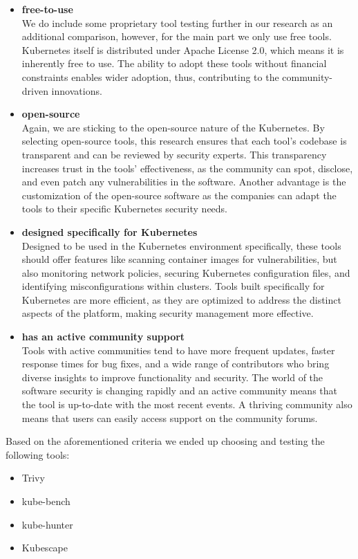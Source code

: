 \begin{itemize}
\item \textbf{free-to-use} \\
We do include some proprietary tool testing further in our research as an additional comparison, however, for the main part we only use free tools. Kubernetes itself is distributed under Apache License 2.0, which means it is inherently free to use. The ability to adopt these tools without financial constraints enables wider adoption, thus, contributing to the community-driven innovations.
\item \textbf{open-source} \\
Again, we are sticking to the open-source nature of the Kubernetes. By selecting open-source tools, this research ensures that each tool's codebase is transparent and can be reviewed by security experts. This transparency increases trust in the tools' effectiveness, as the community can spot, disclose, and even patch any vulnerabilities in the software. Another advantage is the customization of the open-source software as the companies can adapt the tools to their specific Kubernetes security needs.
\item \textbf{designed specifically for Kubernetes} \\
Designed to be used in the Kubernetes environment specifically, these tools should offer features like scanning container images for vulnerabilities, but also monitoring network policies, securing Kubernetes configuration files, and identifying misconfigurations within clusters. Tools built specifically for Kubernetes are more efficient, as they are optimized to address the distinct aspects of the platform, making security management more effective.
\item \textbf{has an active community support} \\
Tools with active communities tend to have more frequent updates, faster response times for bug fixes, and a wide range of contributors who bring diverse insights to improve functionality and security. The world of the software security is changing rapidly and an active community means that the tool is up-to-date with the most recent events. A thriving community also means that users can easily access support on the community forums.
\end{itemize}

Based on the aforementioned criteria we ended up choosing and testing the following tools:
\begin{itemize}
\item Trivy
\item kube-bench
\item kube-hunter
\item Kubescape
\end{itemize}

